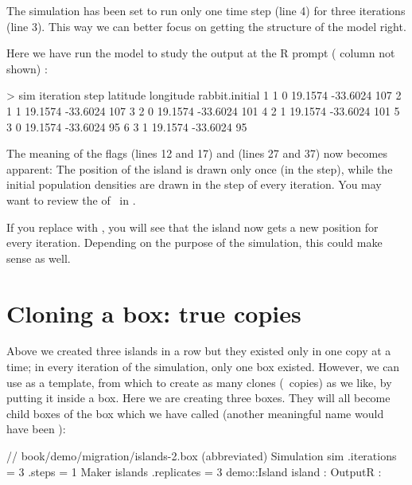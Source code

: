 The simulation has been set to run only one time step (line 4) for three iterations (line 3). This way we can better focus on getting the structure of the model right.

Here we have run the model to study the output at the R prompt ( column not shown) :
\begin{rdialog} 
> sim
  iteration step latitude longitude rabbit.initial
1         1    0  19.1574  -33.6024            107
2         1    1  19.1574  -33.6024            107
3         2    0  19.1574  -33.6024            101
4         2    1  19.1574  -33.6024            101
5         3    0  19.1574  -33.6024             95
6         3    1  19.1574  -33.6024             95
\end{rdialog} 

The meaning of the flags  (lines 12 and 17) and  (lines 27 and 37) now becomes apparent: The position of the island is drawn only once (in the  step), while the initial population densities are drawn in the  step of every iteration. You may want to review the  of \US\ in .

If you replace  with , you will see that the island now gets a new position for every iteration. Depending on the purpose of the simulation, this could make sense as well.

\section{Cloning a box: true copies}
Above we created three islands in a row but they existed only in one copy at a time; in every iteration of the simulation, only one  box existed. However, we can use  as a template, from which to create as many clones (\ie\ copies) as we like, by putting it inside a  box. Here we are creating three  boxes. They will all become child boxes of the  box which we have called  (another meaningful name would have been ):
\lstset{numbers=left}
\begin{boxscript}
// book/demo/migration/islands-2.box (abbreviated)
Simulation sim {
	.iterations = 3
	.steps = 1
	Maker islands {
		.replicates = 3
		demo::Island island {
		:
		}
	}
	OutputR {
	:
	}
}
\end{boxscript}
\lstset{numbers=none}

